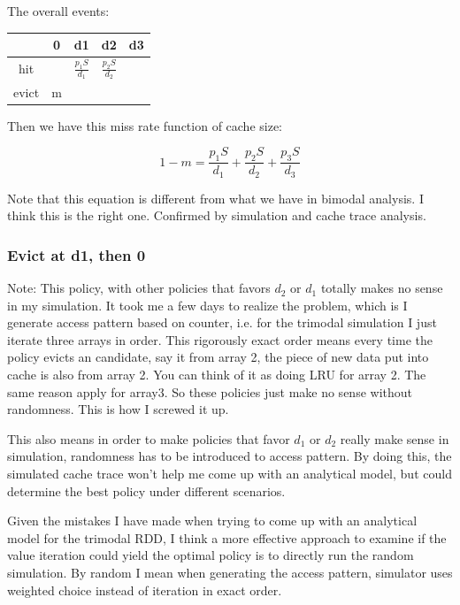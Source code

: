\documentclass[12pt, letterpaper]{article}
\begin{document}
The overall events:

\begin{center}
\begin{tabular}{ c | c c c c }
\hline
 	&	0 & d1  & d2 & d3\\ 
\hline
 hit &	  & $\frac{p_1 S}{d_1}$ & $\frac{p_2 S}{d_2}$  &\\  
 evict &	m &    & &\\
\hline
\end{tabular}
\end{center}

Then we have this miss rate function of cache size:

\begin{equation}
1-m = \frac{p_1 S}{d_1} + \frac{p_2 S}{d_2} + \frac{p_3 S}{d_3}
\end{equation}

Note that this equation is different from what we have in bimodal analysis. I
think this is the right one. Confirmed by simulation and cache trace analysis.

\subsubsection{Evict at d1, then 0}
\label{sec:d1-0}

Note: This policy, with other policies that favors $d_2$ or $d_1$ totally makes
no sense in my simulation. It took me a few days to realize the problem, which
is I generate access pattern based on counter, i.e. for the trimodal simulation
I just iterate three arrays in order. This rigorously exact order means every
time the policy evicts an candidate, say it from array 2, the piece of new data
put into cache is also from array 2. You can think of it as doing LRU for array
2.  The same reason apply for array3. So these policies just make no sense
without randomness. This is how I screwed it up.

This also means in order to make policies that favor $d_1$ or $d_2$ really make
sense in simulation, randomness has to be introduced to access pattern. By doing
this, the simulated cache trace won't help me come up with an analytical model,
but could determine the best policy under different scenarios.

Given the mistakes I have made when trying to come up with an analytical model
for the trimodal RDD, I think a more effective approach to examine if the value
iteration could yield the optimal policy is to directly run the random
simulation. By random I mean when generating the access pattern, simulator uses
weighted choice instead of iteration in exact order. 
\end{document}
